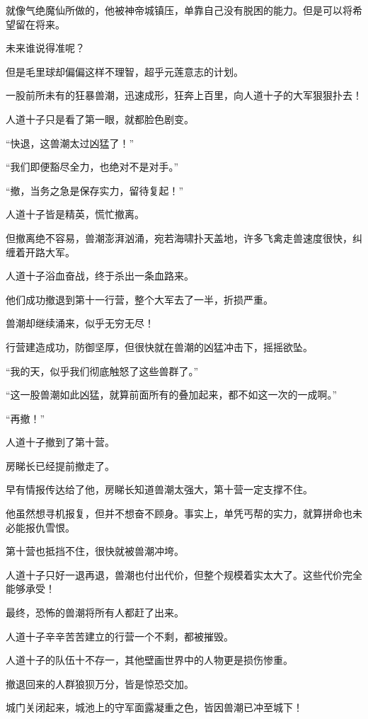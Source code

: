 \begin{this_body}
就像气绝魔仙所做的，他被神帝城镇压，单靠自己没有脱困的能力。但是可以将希望留在将来。

未来谁说得准呢？

但是毛里球却偏偏这样不理智，超乎元莲意志的计划。

一股前所未有的狂暴兽潮，迅速成形，狂奔上百里，向人道十子的大军狠狠扑去！

人道十子只是看了第一眼，就都脸色剧变。

“快退，这兽潮太过凶猛了！”

“我们即便豁尽全力，也绝对不是对手。”

“撤，当务之急是保存实力，留待复起！”

人道十子皆是精英，慌忙撤离。

但撤离绝不容易，兽潮澎湃汹涌，宛若海啸扑天盖地，许多飞禽走兽速度很快，纠缠着开路大军。

人道十子浴血奋战，终于杀出一条血路来。

他们成功撤退到第十一行营，整个大军去了一半，折损严重。

兽潮却继续涌来，似乎无穷无尽！

行营建造成功，防御坚厚，但很快就在兽潮的凶猛冲击下，摇摇欲坠。

“我的天，似乎我们彻底触怒了这些兽群了。”

“这一股兽潮如此凶猛，就算前面所有的叠加起来，都不如这一次的一成啊。”

“再撤！”

人道十子撤到了第十营。

房睇长已经提前撤走了。

早有情报传达给了他，房睇长知道兽潮太强大，第十营一定支撑不住。

他虽然想寻机报复，但并不想奋不顾身。事实上，单凭丐帮的实力，就算拼命也未必能报仇雪恨。

第十营也抵挡不住，很快就被兽潮冲垮。

人道十子只好一退再退，兽潮也付出代价，但整个规模着实太大了。这些代价完全能够承受！

最终，恐怖的兽潮将所有人都赶了出来。

人道十子辛辛苦苦建立的行营一个不剩，都被摧毁。

人道十子的队伍十不存一，其他壁画世界中的人物更是损伤惨重。

撤退回来的人群狼狈万分，皆是惊恐交加。

城门关闭起来，城池上的守军面露凝重之色，皆因兽潮已冲至城下！


\end{this_body}
